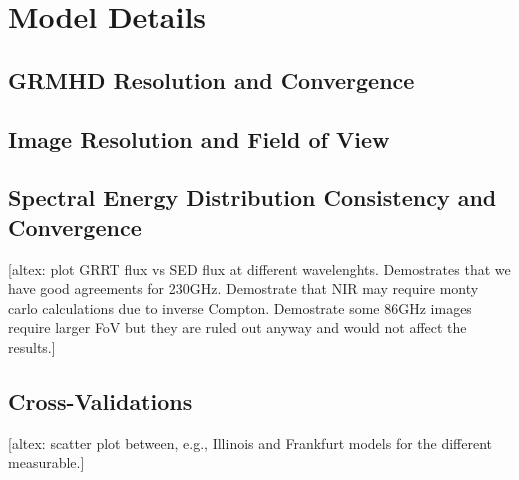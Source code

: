 \section{Model Details}\label{app:numerical}

\subsection{GRMHD Resolution and Convergence}\label{app:resolution_study}

\subsection{Image Resolution and Field of View}

\subsection{Spectral Energy Distribution Consistency and Convergence}

\begin{figure*}
    \centering
    [altex: plot GRRT flux vs SED flux at different wavelenghts.  Demostrates that we have good agreements for 230GHz.  Demostrate that NIR may require monty carlo calculations due to inverse Compton.  Demostrate some 86GHz images require larger FoV but they are ruled out anyway and would not affect the results.]
    \caption{Comparing GRRT flux from monte carlo calculations.  The three columns are 86GHz, 230GHz, and NIR, respectively.  GRRT is only used to spot check x-ray and does not have a corresponding scatter plot.}
    \label{fig:my_label}
\end{figure*}

\subsection{Cross-Validations}

\begin{figure*}
    \centering
    [altex: scatter plot between, e.g., Illinois and Frankfurt models for the different measurable.]
    \caption{Comparing model predictions from different modeling pipelines.  ...}
    \label{fig:my_label}
\end{figure*}